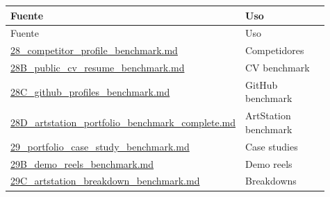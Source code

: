 \begin{center}
\scriptsize
\begin{longtable}{>{\raggedright\arraybackslash}p{0.455\linewidth} >{\raggedright\arraybackslash}p{0.455\linewidth}}
\toprule
Fuente & Uso \\
\midrule
\endfirsthead
\toprule
Fuente & Uso \\
\midrule
\endhead
\href{file:///E:/Laboral/28_competitor_profile_benchmark.md}{28\_competitor\_profile\_benchmark.md} & Competidores \\
\href{file:///E:/Laboral/28B_public_cv_resume_benchmark.md}{28B\_public\_cv\_resume\_benchmark.md} & CV benchmark \\
\href{file:///E:/Laboral/28C_github_profiles_benchmark.md}{28C\_github\_profiles\_benchmark.md} & GitHub benchmark \\
\href{file:///E:/Laboral/28D_artstation_portfolio_benchmark_complete.md}{28D\_artstation\_portfolio\_benchmark\_complete.md} & ArtStation benchmark \\
\href{file:///E:/Laboral/29_portfolio_case_study_benchmark.md}{29\_portfolio\_case\_study\_benchmark.md} & Case studies \\
\href{file:///E:/Laboral/29B_demo_reels_benchmark.md}{29B\_demo\_reels\_benchmark.md} & Demo reels \\
\href{file:///E:/Laboral/29C_artstation_breakdown_benchmark.md}{29C\_artstation\_breakdown\_benchmark.md} & Breakdowns \\
\bottomrule
\end{longtable}
\end{center}
